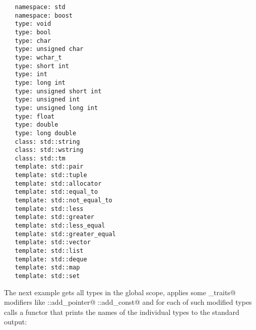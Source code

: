 \begin{verbatim}
   namespace: std
   namespace: boost
   type: void
   type: bool
   type: char
   type: unsigned char
   type: wchar_t
   type: short int
   type: int
   type: long int
   type: unsigned short int
   type: unsigned int
   type: unsigned long int
   type: float
   type: double
   type: long double
   class: std::string
   class: std::wstring
   class: std::tm
   template: std::pair
   template: std::tuple
   template: std::allocator
   template: std::equal_to
   template: std::not_equal_to
   template: std::less
   template: std::greater
   template: std::less_equal
   template: std::greater_equal
   template: std::vector
   template: std::list
   template: std::deque
   template: std::map
   template: std::set
\end{verbatim}

The next example gets all types in the global scope,
applies some \verb@type_traits@ modifiers like \verb@std::add_pointer@
\verb@std::add_const@ and for each of such modified types calls a functor
that prints the names of the individual types to the standard output:

